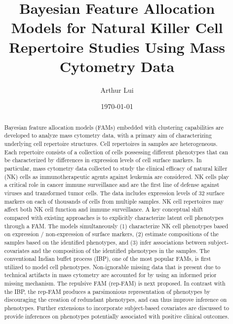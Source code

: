 \documentclass[12pt,]{article}
\title{Bayesian Feature Allocation Models for Natural Killer Cell Repertoire Studies Using Mass Cytometry Data}
\author{Arthur Lui}
\date{\today}
\begin{document}
\maketitle
\onehalfspacing



\begin{abstract}
\noindent
Bayesian feature allocation models (FAMs) embedded with clustering capabilities
are developed to analyze mass cytometry data, with a primary aim of
characterizing underlying cell repertoire structures.   Cell repertoires in
samples are heterogeneous. Each repertoire consists of a collection of cells
possessing different phenotypes that can be characterized by differences in
expression levels of cell surface markers.  In particular, mass cytometry data
collected to study the clinical efficacy of natural killer (NK) cells as
immunotherapeutic agents against leukemia are considered. NK cells play a
critical role in cancer immune surveillance and are the first line of defense
against viruses and transformed tumor cells.  The data includes expression
levels of 32 surface markers on each of thousands of cells from multiple
samples. NK cell repertoires may affect both NK cell function and immune
surveillance.  A key conceptual shift compared with existing approaches is to
explicitly characterize latent cell phenotypes through a FAM.  The models
simultaneously (1) characterize NK cell phenotypes based on expression /
non-expression of surface markers, (2) estimate compositions of the samples
based on the identified phenotypes, and (3) infer associations between
subject-covariates and the composition of the identified phenotypes in the
samples.  The conventional Indian buffet process (IBP), one of the most popular
FAMs, is first utilized to model cell phenotypes. Non-ignorable missing data
that is present due to technical artifacts in mass cytometry are accounted for
by using an informed prior missing mechanism. The repulsive FAM (rep-FAM) is
next proposed.  In contrast with the IBP, the rep-FAM produces a parsimonious
representation of phenotypes by discouraging the creation of redundant
phenotypes, and can thus improve inference on phenotypes.  Further extensions
to incorporate subject-based covariates are discussed to provide inferences on
phenotypes potentially associated with positive clinical outcomes.  

\end{abstract}
\end{document}
